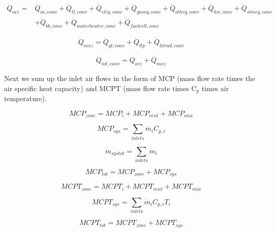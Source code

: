 {\begin{equation}
\begin{split}
\dot Q_{ocz} =& \dot Q_{oc,conv} + \dot Q_{tl,conv} + \dot Q_{eleq,conv} + \dot Q_{gaseq,conv} + \dot Q_{otheq,conv} + \dot Q_{hw,conv} + \dot Q_{stmeq,conv} \\
&+ \dot Q_{bb,conv} + \dot Q_{waterheater,conv} + \dot Q_{fuelcell,conv}
\end{split}
\end{equation}

\begin{equation}
{\dot Q_{mxz}} = {\dot Q_{gl,conv}} + {\dot Q_{ltp}} + {\dot Q_{htrad,conv}}
\end{equation}

\begin{equation}
{\dot Q_{tot,conv}} = {\dot Q_{ocz}} + {\dot Q_{mxz}}
\end{equation}

Next we sum up the inlet air flows in the form of MCP (mass flow rate times the air specific heat capacity) and MCPT (mass flow rate times C\(_{p}\) times air temperature).

\begin{equation}
MC{P_{zone}} = MC{P_i} + MC{P_{vent}} + MC{P_{mix}}
\end{equation}

\begin{equation}
MC{P_{sys}} = \sum\limits_{inlets} {{{\dot m}_i}} {C_{p,i}}
\end{equation}

\begin{equation}
{\dot m_{systot}} = \sum\limits_{inlets} {{{\dot m}_i}}
\end{equation}

\begin{equation}
MC{P_{tot}} = MC{P_{zone}} + MC{P_{sys}}
\end{equation}

\begin{equation}
MCP{T_{zone}} = MCP{T_i} + MCP{T_{vent}} + MCP{T_{mix}}
\end{equation}

\begin{equation}
MCP{T_{sys}} = \sum\limits_{inlets} {{{\dot m}_i}} {C_{p,i}}{T_i}
\end{equation}

\begin{equation}
MCP{T_{tot}} = MCP{T_{zone}} + MCP{T_{sys}}
\end{equation}

}
